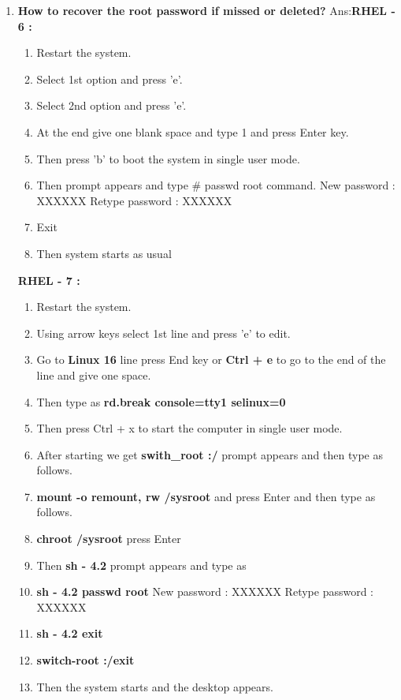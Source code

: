 \begin{enumerate}
    \item \textbf{How to recover the root password if missed or deleted?}
    \newline
    Ans:\textbf{RHEL - 6 :}
     \begin{enumerate}
        \item Restart the system.
        \item Select  1st  option and press  'e'.
        \item Select 2nd option and press  'e'.
        \item At the end give one blank space and type  1  and press Enter key.
        \item  Then press  'b'  to boot the system in single user mode.
        \item Then prompt appears and type    # passwd root    command.
        \newline
                              New password :  XXXXXX
                              Retype password :  XXXXXX
        \item Exit
        \item Then system starts as usual
     \end{enumerate}
    \textbf{RHEL - 7 :}
      \begin{enumerate}
        \item Restart the system.
        \item Using arrow keys select  1st line and  press  'e'  to edit.
        \item Go to  \textbf{Linux 16 } line press End key  or  \textbf{Ctrl + e } to go to the end of the line and give one space.
        \item Then type as   \textbf{rd.break   console=tty1   selinux=0}
        \item Then press    Ctrl + x   to start the computer in single user mode.
        \item After starting  we get \textbf{ swith_root :/ }  prompt appears and then type as follows.
        \item \textbf{mount   -o   remount, rw    /sysroot }  and press Enter and then type as follows.
        \item \textbf{chroot   /sysroot  }  press Enter
        \item Then   \textbf{sh - 4.2 }  prompt appears and type as 
        \item \textbf{sh - 4.2 passwd root}
               New password :  XXXXXX
               Retype password :  XXXXXX
        \item \textbf{sh - 4.2 exit}
        \item \textbf{switch-root :/exit}
        \item Then the system starts and the desktop appears.
      \end{enumerate}


\end{enumerate}
